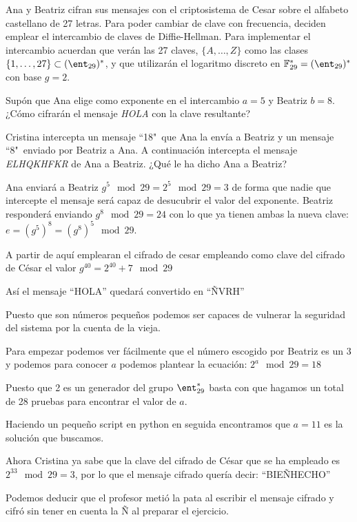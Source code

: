 \begin{problem}[5] Ana y Beatriz cifran sus mensajes con el criptosistema de Cesar
sobre el alfabeto castellano de 27 letras. Para poder cambiar de
clave con frecuencia, deciden emplear el intercambio de claves de
Diffie-Hellman. Para implementar el intercambio acuerdan que verán
las 27 claves, $\{A,\dots,Z\}$ como las clases
$\{1,\dots,27\}\subset(\ent_{29})^*$, y que utilizarán el logaritmo
discreto en $\mathbb{F}_{29}^*=(\ent_{29})^*$ con base $g=2$.

\ppart Supón que Ana elige como exponente en el intercambio $a=5$ y
Beatriz $b=8$. ¿Cómo cifrarán el mensaje {\it HOLA} con la clave
resultante?



\ppart Cristina intercepta un mensaje ``18"\ que Ana la envía a Beatriz
y un mensaje ``8"\ enviado por Beatriz a Ana. A continuación
intercepta el mensaje {\it ELHQKHFKR} de Ana a Beatriz. ¿Qué le ha
dicho Ana a Beatriz?

\solution

\spart

Ana enviará a Beatriz $g^5 \mod 29 = 2^5 \mod 29 = 3$ de forma que nadie que intercepte el mensaje será capaz de desucubrir el valor del exponente. Beatriz responderá enviando $g^{8} \mod 29 = 24$ con lo que ya tienen ambas la nueva clave: $e=(g^5)^8=(g^8)^5 \mod 29$.

A partir de aquí emplearan el cifrado de cesar empleando como clave del cifrado de César el valor $g^{40}=2^{40}+7 \mod 29$

Así el mensaje ``HOLA'' quedará convertido en ``ÑVRH''

\spart

Puesto que son números pequeños podemos ser capaces de vulnerar la seguridad del sistema por la cuenta de la vieja.

Para empezar podemos ver fácilmente que el número escogido por Beatriz es un $3$ y podemos para conocer $a$ podemos plantear la ecuación: $2^a \mod 29=18$

Puesto que 2 es un generador del grupo $\ent_{29}^*$ basta con que hagamos un total de 28 pruebas para encontrar el valor de $a$.

Haciendo un pequeño script en python en seguida encontramos que $a=11$ es la solución que buscamos.

Ahora Cristina ya sabe que la clave del cifrado de César que se ha empleado es $2^{33} \mod 29 =3$, por lo que el mensaje cifrado quería decir: ``BIEÑHECHO''

Podemos deducir que el profesor metió la pata al escribir el mensaje cifrado y cifró sin tener en cuenta la Ñ al preparar el ejercicio.
\end{problem}

